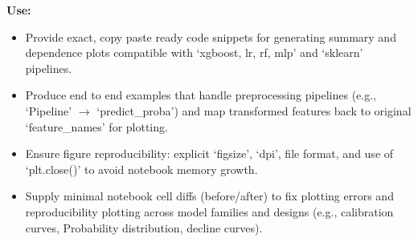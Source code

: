 \textbf{Use:}
\begin{itemize}
    \item[-] Provide exact, copy paste ready code snippets for generating summary and dependence plots compatible with `xgboost, lr, rf, mlp' and `sklearn' pipelines.
    \item[-] Produce end to end examples that handle preprocessing pipelines (e.g., `Pipeline' $\rightarrow$ `predict\_proba') and map transformed features back to original `feature\_names' for plotting.
    \item[-] Ensure figure reproducibility: explicit `figsize', `dpi', file format, and use of `plt.close()' to avoid notebook memory growth.
    \item[-] Supply minimal notebook cell diffs (before/after) to fix plotting errors and reproducibility plotting across model families and designs (e.g., calibration curves, Probability distribution, decline curves).
\end{itemize}